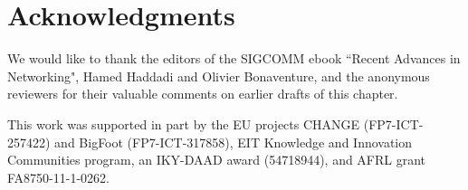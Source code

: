 \section{Acknowledgments}\label{sec:acknowledgment}

We would like to thank the editors of the SIGCOMM ebook ``Recent Advances in
Networking", Hamed Haddadi and Olivier Bonaventure, and the anonymous reviewers
for their valuable comments on earlier drafts of this chapter.  

This work was supported in part by the EU projects CHANGE (FP7-ICT-257422) and
BigFoot (FP7-ICT-317858), EIT Knowledge and Innovation Communities program, an
IKY-DAAD award (54718944), and AFRL grant FA8750-11-1-0262.

